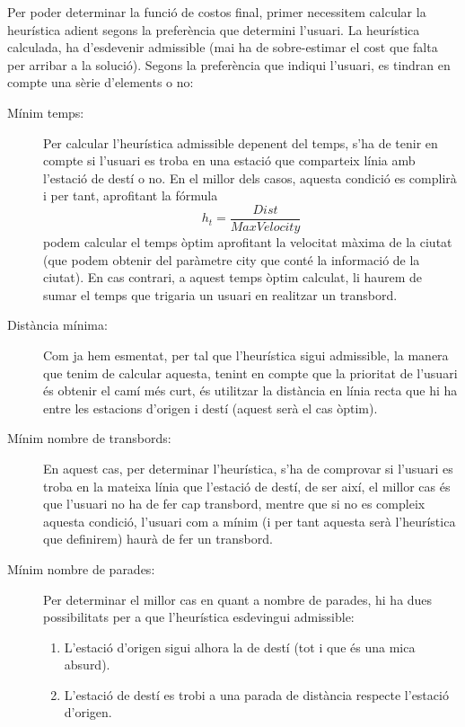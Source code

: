 \documentclass[a4paper,12pt,hidelinks]{article}
\begin{document}
            Per poder determinar la funció de costos final, primer necessitem calcular la heurística adient segons la preferència que determini l’usuari.
            La heurística calculada, ha d’esdevenir admissible (mai ha de sobre-estimar el cost que falta per arribar a la solució).
            Segons la preferència que indiqui l’usuari, es tindran en compte una sèrie d’elements o no:
            \begin{description}
                \item[Mínim temps:] Per calcular l’heurística admissible depenent del temps, s’ha de tenir en compte si l’usuari es troba en una estació que comparteix línia amb l’estació de destí o no. En el millor dels casos, aquesta condició es complirà i per tant, aprofitant la fórmula
                \begin{equation*} \label{eq:velocity}
                    h_t = \frac{Dist}{MaxVelocity}
                \end{equation*}
                podem calcular el temps òptim aprofitant la velocitat màxima de la ciutat (que podem obtenir del paràmetre city que conté la informació de la ciutat).
                En cas contrari, a aquest temps òptim calculat, li haurem de sumar el temps que trigaria un usuari en realitzar un transbord.
                \item[Distància mínima:] Com ja hem esmentat, per tal que l’heurística sigui admissible, la manera que tenim de calcular aquesta, tenint en compte que la prioritat de l’usuari és obtenir el camí més curt, és utilitzar la distància en línia recta que hi ha entre les estacions d’origen i destí (aquest serà el cas òptim).
                \item[Mínim nombre de transbords:] En aquest cas, per determinar l’heurística, s’ha de comprovar si l’usuari es troba en la mateixa línia que l’estació de destí, de ser així, el millor cas és que l’usuari no ha de fer cap transbord, mentre que si no es compleix aquesta condició, l’usuari com a mínim (i per tant aquesta serà l’heurística que definirem) haurà de fer un transbord.
                \item[Mínim nombre de parades:] Per determinar el millor cas en quant a nombre de parades, hi ha dues possibilitats per a que l’heurística esdevingui admissible:
                \begin{enumerate}
                    \item L’estació d’origen sigui alhora la de destí (tot i que és una mica absurd).
                    \item L’estació de destí es trobi a una parada de distància respecte l’estació d’origen.
                \end{enumerate} 
            \end{description}
        
\end{document}
